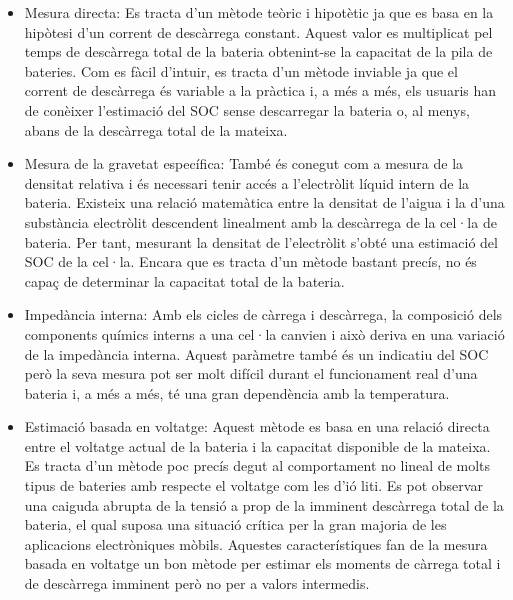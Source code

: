 \begin{itemize}
    \item Mesura directa: Es tracta d'un mètode teòric i hipotètic ja que es basa en la hipòtesi d'un corrent de descàrrega constant. Aquest valor es multiplicat pel temps de descàrrega total de la bateria obtenint-se la capacitat de la pila de bateries. Com es fàcil d'intuir, es tracta d'un mètode inviable ja que el corrent de descàrrega és variable a la pràctica i, a més a més, els usuaris han de conèixer l'estimació del SOC sense descarregar la bateria o, al menys, abans de la descàrrega total de la mateixa.
   
    \item Mesura de la gravetat específica: També és conegut com a mesura de la densitat relativa i és necessari tenir accés a l'electròlit líquid intern de la bateria. Existeix una relació matemàtica entre la densitat de l'aigua i la d'una substància electròlit descendent linealment amb la descàrrega de la cel·la de bateria. Per tant, mesurant la densitat de l'electròlit s'obté una estimació del SOC de la cel·la. Encara que es tracta d'un mètode bastant precís, no és capaç de determinar la capacitat total de la bateria. 
   
    \item Impedància interna: Amb els cicles de càrrega i descàrrega, la composició dels components químics interns a una cel·la canvien i això deriva en una variació de la impedància interna. Aquest paràmetre també és un indicatiu del SOC però la seva mesura pot ser molt difícil durant el funcionament real d'una bateria i, a més a més, té una gran dependència amb la temperatura.
   
    \item Estimació basada en voltatge: Aquest mètode es basa en una relació directa entre el voltatge actual de la bateria i la capacitat disponible de la mateixa. Es tracta d'un mètode poc precís degut al comportament no lineal de molts tipus de bateries amb respecte el voltatge com les d'ió liti. Es pot observar una caiguda abrupta de la tensió a prop de la imminent descàrrega total de la bateria, el qual suposa una situació crítica per la gran majoria de les aplicacions electròniques mòbils. Aquestes característiques fan de la mesura basada en voltatge un bon mètode per estimar els moments de càrrega total i de \newline descàrrega imminent però no per a valors intermedis.
   

\end{itemize}
